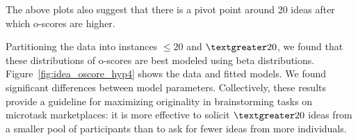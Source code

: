 
The above plots also suggest that there is a pivot point around 20 ideas after which o-scores are higher.


Partitioning the data into instances $\leq20$ and $\textgreater20$, we found that these distributions of o-scores are best modeled using beta distributions. Figure~\ref{fig:idea_oscore_hyp4} shows the data and fitted models. We found significant differences between model parameters.
Collectively, these results provide a guideline for maximizing originality in brainstorming tasks on microtask marketplaces: it is more effective to solicit $\textgreater20$ ideas from a smaller pool of participants than to ask for fewer ideas from more individuals.





